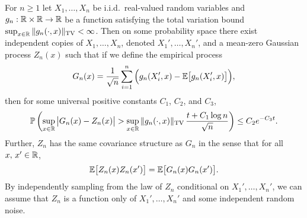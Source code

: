 \begin{lemma}
  \label{lem:kernel_app_kmt_corollary}

  For $n \geq 1$
  let $X_1, \ldots, X_n$
  be i.i.d.\ real-valued random variables and
  $g_n: \mathbb{R} \times \mathbb{R} \to \mathbb{R}$
  be a function satisfying
  the total variation bound
  $\sup_{x \in \mathbb{R}} \|g_n(\cdot, x)\|_{\mathrm{TV}} < \infty$.
  Then on some probability space
  there exist independent copies of
  $X_1, \ldots, X_n$,
  denoted
  $X_1', \ldots, X_n'$,
  and a mean-zero Gaussian process $Z_n(x)$
  such that if we define
  the empirical process
  \begin{align*}
    G_n(x)
    = \frac{1}{\sqrt n} \sum_{i=1}^n
    \Big(g_n(X_i',x) - \mathbb{E}\big[g_n(X_i',x)\big]\Big),
  \end{align*}
  then
  for some universal positive constants
  $C_1$, $C_2$, and $C_3$,
  \begin{align*}
    \mathbb{P}\left(
      \sup_{x \in \mathbb{R}}
      \big|G_n(x) - Z_n(x)\big|
      > \sup_{x \in \mathbb{R}} \|g_n(\cdot, x)\|_{\mathrm{TV}}
      \, \frac{t + C_1 \log n}{\sqrt n}
    \right)
    \leq C_2 e^{-C_3 t}.
  \end{align*}
  Further, $Z_n$
  has the same covariance structure as $G_n$
  in the sense that for all $x,\, x' \in \mathbb{R}$,
  \begin{align*}
    \mathbb{E}\big[Z_n(x) Z_n(x')\big]
    = \mathbb{E}\big[G_n(x) G_n(x')\big].
  \end{align*}
  By independently sampling from the law of
  $Z_n$ conditional on $X_1', \ldots, X_n'$,
  we can assume that
  $Z_n$ is a function only of $X_1', \ldots, X_n'$
  and some independent random noise.

\end{lemma}

